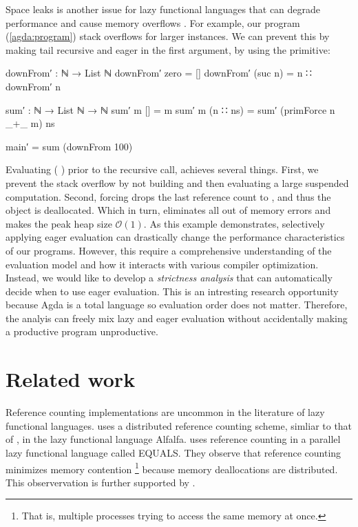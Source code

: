 \documentclass[9pt, twocolumn]{article}
\renewcommand{\AgdaUnderscore}{\texttt{\_}}
\newcommand{\refp}[1]{(\ref{#1})}
\begin{document}
Space leaks is another issue for lazy functional languages that can degrade performance and cause memory overflows \citep{jones1987}.
For example, our program \refp{agda:program} stack overflows for larger instances.
We can prevent this by making  tail recursive and eager in the first argument, by using the \mbox{} primitive:

\begin{code}[number=agda:final-program]
downFrom′ : ℕ → List ℕ
downFrom′ zero = []
downFrom′ (suc n) = n ∷ downFrom′ n 

sum′ : ℕ → List ℕ → ℕ
sum′ m [] = m
sum′ m (n ∷ ns) = 
  sum′ (primForce n _+_ m) ns

main′ = sum (downFrom 100) 
\end{code}
Evaluating (  \AgdaFunction{\AgdaUnderscore+\AgdaUnderscore} ) prior to the recursive call, achieves several things.
First, we prevent the stack overflow by not building and then evaluating a large suspended computation.
Second, forcing \AgdaFunction{\AgdaUnderscore+\AgdaUnderscore} drops the last reference count to , and thus the object is deallocated. 
Which in turn, eliminates all out of memory errors and makes the peak heap size $\mathcal{O}(1)$.
As this example demonstrates, selectively applying eager evaluation can drastically change the performance characteristics of our programs.
However, this require a comprehensive understanding of the evaluation model and how it interacts with various compiler optimization.
Instead, we would like to develop a \emph{strictness analysis} \citep{mycroft1980} that can automatically decide when to use eager evaluation.
This is an intresting research opportunity because Agda is a total language so evaluation order does not matter.
Therefore, the analyis can freely mix lazy and eager evaluation without accidentally making a productive program unproductive.

\section{Related work}
Reference counting implementations are uncommon in the literature of lazy functional languages.
\citet{goldberg1988} uses a distributed reference counting scheme, simliar to that of \citet{lermen1986}, in the lazy functional language Alfalfa.
\citet{kaser1992} uses reference counting in a parallel lazy functional language called EQUALS. 
They observe that reference counting minimizes memory contention%
\footnote{That is, multiple processes trying to access the same memory at once.} %
because memory deallocations are distributed. 
This observervation is further supported by \citet{jones1987, jones1996}.
\end{document}
